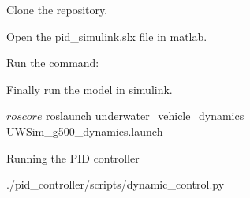 
\begin{DoxyEnumerate}
\item Clone the repository.
\item Open the pid\+\_\+simulink.\+slx file in matlab.
\item Run the command\+: 

\item Finally run the model in simulink.
\end{DoxyEnumerate}


\begin{DoxyCode}
$ roscore
$ roslaunch underwater\_vehicle\_dynamics UWSim\_g500\_dynamics.launch
\end{DoxyCode}
 Running the P\+ID controller 
\begin{DoxyCode}
./pid\_controller/scripts/dynamic\_control.py
\end{DoxyCode}
 